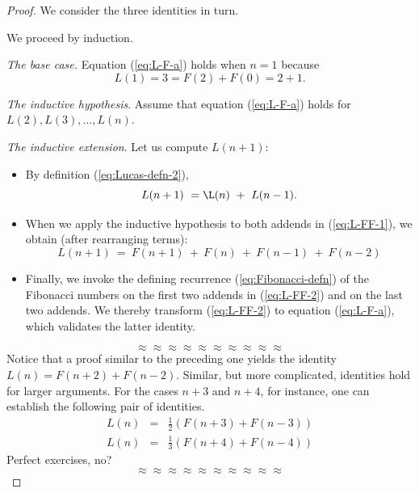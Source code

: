 \begin{proof}
We consider the three identities in turn.

We proceed by induction.

\medskip

\noindent
{\it The base case.}
Equation (\ref{eq:L-F-a}) holds when $n=1$ because
\[ L(1) = 3 = F(2) + F(0) = 2+1. \]

\medskip

\noindent
{\it The inductive hypothesis}.
Assume that equation (\ref{eq:L-F-a}) holds for $L(2), L(3), \ldots,
L(n)$.

\medskip

\noindent
{\it The inductive extension}. 
Let us compute $L(n+1)$:
\begin{itemize}
\item
By definition (\ref{eq:Lucas-defn-2}),
\begin{equation}
\label{eq:L-FF-1}
L(n+1) \ = \L(n) \ + \ L(n-1).
\end{equation}
\item
When we apply the inductive hypothesis to both addends in
(\ref{eq:L-FF-1}), we obtain (after rearranging terms):
\begin{equation}
\label{eq:L-FF-2}
L(n+1) \ = \  F(n+1) \ + \ F(n) \ + \ F(n-1) \ + \ F(n-2)
\end{equation}
\item
Finally, we invoke the defining recurrence (\ref{eq:Fibonacci-defn})
of the Fibonacci numbers on the first two addends in (\ref{eq:L-FF-2})
and on the last two addends.  We thereby transform (\ref{eq:L-FF-2})
to equation (\ref{eq:L-F-a}), which validates the latter identity.
\end{itemize}

\[ \approx \approx \approx \approx \approx \approx \approx \approx \approx \approx \]
Notice that a proof similar to the preceding one yields the identity
$L(n) = F(n+2) + F(n-2)$.  Similar, but more complicated, identities
hold for larger arguments.  For the cases $n+3$ and $n+4$, for
instance, one can establish the following pair of identities.
\begin{eqnarray}
\label{eq:LF:n+3}
L(n) & = & \frac{1}{2} (F(n+3)+F(n-3)) \\
\label{eq:LF:n+4}
L(n) & = & \frac{1}{3} (F(n+4)+F(n-4))
\end{eqnarray}
{\Arny Perfect exercises, no?}
\[ \approx \approx \approx \approx \approx \approx \approx \approx \approx \approx \]


\end{proof}
